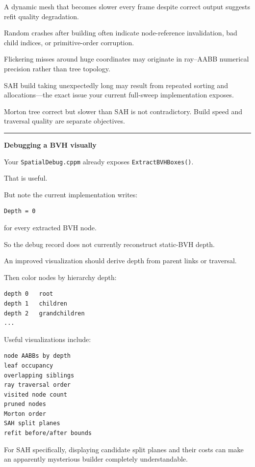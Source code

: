 A dynamic mesh that becomes slower every frame despite correct output suggests refit quality degradation.

Random crashes after building often indicate node-reference invalidation, bad child indices, or primitive-order corruption.

Flickering misses around huge coordinates may originate in ray--AABB numerical precision rather than tree topology.

SAH build taking unexpectedly long may result from repeated sorting and allocations---the exact issue your current full-sweep implementation exposes.

Morton tree correct but slower than SAH is not contradictory. Build speed and traversal quality are separate objectives.

\begin{center}\rule{0.5\linewidth}{0.5pt}\end{center}

\textbf{Debugging a BVH visually}

Your \texttt{SpatialDebug.cppm} already exposes \texttt{ExtractBVHBoxes()}.

That is useful.

But note the current implementation writes:

\begin{verbatim}
Depth = 0
\end{verbatim}

for every extracted BVH node.

So the debug record does not currently reconstruct static-BVH depth.

An improved visualization should derive depth from parent links or traversal.

Then color nodes by hierarchy depth:

\begin{verbatim}
depth 0   root
depth 1   children
depth 2   grandchildren
...
\end{verbatim}

Useful visualizations include:

\begin{verbatim}
node AABBs by depth
leaf occupancy
overlapping siblings
ray traversal order
visited node count
pruned nodes
Morton order
SAH split planes
refit before/after bounds
\end{verbatim}

For SAH specifically, displaying candidate split planes and their costs can make an apparently mysterious builder completely understandable.

